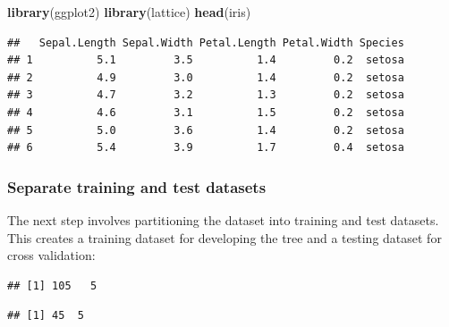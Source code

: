 \documentclass[
]{article}
\newenvironment{Shaded}{\begin{snugshade}}{\end{snugshade}}
\newcommand{\DataTypeTok}[1]{\textcolor[rgb]{0.13,0.29,0.53}{#1}}
\newcommand{\FloatTok}[1]{\textcolor[rgb]{0.00,0.00,0.81}{#1}}
\newcommand{\KeywordTok}[1]{\textcolor[rgb]{0.13,0.29,0.53}{\textbf{#1}}}
\newcommand{\NormalTok}[1]{#1}
\newcommand{\OperatorTok}[1]{\textcolor[rgb]{0.81,0.36,0.00}{\textbf{#1}}}
\newcommand{\OtherTok}[1]{\textcolor[rgb]{0.56,0.35,0.01}{#1}}
\newcommand{\StringTok}[1]{\textcolor[rgb]{0.31,0.60,0.02}{#1}}
\begin{document}
\begin{Shaded}
\begin{Highlighting}[]
\KeywordTok{library}\NormalTok{(ggplot2)}
\KeywordTok{library}\NormalTok{(lattice)}
\KeywordTok{head}\NormalTok{(iris)}
\end{Highlighting}
\end{Shaded}

\begin{verbatim}
##   Sepal.Length Sepal.Width Petal.Length Petal.Width Species
## 1          5.1         3.5          1.4         0.2  setosa
## 2          4.9         3.0          1.4         0.2  setosa
## 3          4.7         3.2          1.3         0.2  setosa
## 4          4.6         3.1          1.5         0.2  setosa
## 5          5.0         3.6          1.4         0.2  setosa
## 6          5.4         3.9          1.7         0.4  setosa
\end{verbatim}

\hypertarget{separate-training-and-test-datasets}{%
\subsubsection{Separate training and test
datasets}\label{separate-training-and-test-datasets}}

The next step involves partitioning the dataset into training and test
datasets. This creates a training dataset for developing the tree and a
testing dataset for cross validation:

\begin{Shaded}
\end{Shaded}

\begin{verbatim}
## [1] 105   5
\end{verbatim}

\begin{verbatim}
## [1] 45  5
\end{verbatim}
\end{document}
